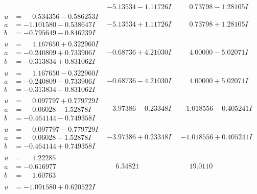 \documentclass[1p]{elsarticle_modified}
\theoremstyle{definition}
\begin{document}
$$\begin{array}{c|c|c}
 & -5.13534 - 1.11726 I & \phantom{-}0.73798 - 1.28105 I \\ \hline\begin{aligned}
u &= \phantom{-}0.534356 - 0.586253 I \\
a &= -1.101580 - 0.538647 I \\
b &= -0.795649 - 0.846239 I\end{aligned}
 & -5.13534 + 1.11726 I & \phantom{-}0.73798 + 1.28105 I \\ \hline\begin{aligned}
u &= \phantom{-}1.167650 + 0.322960 I \\
a &= -0.240809 + 0.733906 I \\
b &= -0.313834 + 0.831062 I\end{aligned}
 & -0.68736 + 4.21030 I & \phantom{-}4.00000 - 5.02071 I \\ \hline\begin{aligned}
u &= \phantom{-}1.167650 - 0.322960 I \\
a &= -0.240809 - 0.733906 I \\
b &= -0.313834 - 0.831062 I\end{aligned}
 & -0.68736 - 4.21030 I & \phantom{-}4.00000 + 5.02071 I \\ \hline\begin{aligned}
u &= \phantom{-}0.097797 + 0.779729 I \\
a &= \phantom{-}0.06028 - 1.52878 I \\
b &= -0.464144 - 0.749358 I\end{aligned}
 & -3.97386 - 0.23348 I & -1.018556 - 0.405241 I \\ \hline\begin{aligned}
u &= \phantom{-}0.097797 - 0.779729 I \\
a &= \phantom{-}0.06028 + 1.52878 I \\
b &= -0.464144 + 0.749358 I\end{aligned}
 & -3.97386 + 0.23348 I & -1.018556 + 0.405241 I \\ \hline\begin{aligned}
u &= \phantom{-}1.22285\phantom{ +0.000000I} \\
a &= -0.616977\phantom{ +0.000000I} \\
b &= \phantom{-}1.60763\phantom{ +0.000000I}\end{aligned}
 & \phantom{-}6.34821\phantom{ +0.000000I} & \phantom{-}19.0110\phantom{ +0.000000I} \\ \hline\begin{aligned}
u &= -1.091580 + 0.620522 I \\

\end{aligned}
\end{array}$$
\end{document}
